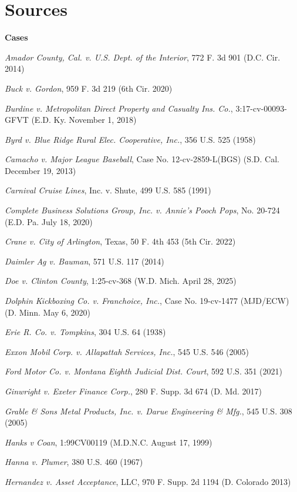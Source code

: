 \pagestyle{plain.scrheadings}

\chapter*{Sources}

{\bfseries\Large{Cases}}

\textit{Amador County, Cal. v. U.S. Dept. of the Interior}, 772 F. 3d 901 (D.C. Cir. 2014)

\textit{Buck v. Gordon}, 959 F. 3d 219 (6th Cir. 2020)

\textit{Burdine v. Metropolitan Direct Property and Casualty Ins. Co.}, 3:17-cv-00093-GFVT (E.D. Ky. November 1, 2018)

\textit{Byrd v. Blue Ridge Rural Elec. Cooperative, Inc.}, 356 U.S. 525 (1958)

\textit{Camacho v. Major League Baseball}, Case No. 12-cv-2859-L(BGS) (S.D. Cal. December 19, 2013)

\textit{Carnival Cruise Lines}, Inc. v. Shute, 499 U.S. 585 (1991)

\textit{Complete Business Solutions Group, Inc. v. Annie’s Pooch Pops}, No. 20-724 (E.D. Pa. July 18, 2020)

\textit{Crane v. City of Arlington}, Texas, 50 F. 4th 453 (5th Cir. 2022)

\textit{Daimler Ag v. Bauman}, 571 U.S. 117 (2014)

\textit{Doe v. Clinton County}, 1:25-cv-368 (W.D. Mich. April 28, 2025)

\textit{Dolphin Kickboxing Co. v. Franchoice, Inc.}, Case No. 19-cv-1477 (MJD/ECW) (D. Minn. May 6, 2020)

\textit{Erie R. Co. v. Tompkins}, 304 U.S. 64 (1938)

\textit{Exxon Mobil Corp. v. Allapattah Services, Inc.}, 545 U.S. 546 (2005)

\textit{Ford Motor Co. v. Montana Eighth Judicial Dist. Court}, 592 U.S. 351 (2021)

\textit{Ginwright v. Exeter Finance Corp.}, 280 F. Supp. 3d 674 (D. Md. 2017)

\textit{Grable \& Sons Metal Products, Inc. v. Darue Engineering \& Mfg.}, 545 U.S. 308 (2005)

\textit{Hanks v Coan}, 1:99CV00119 (M.D.N.C. August 17, 1999)

\textit{Hanna v. Plumer}, 380 U.S. 460 (1967)

\textit{Hernandez v. Asset Acceptance}, LLC, 970 F. Supp. 2d 1194 (D. Colorado 2013)

